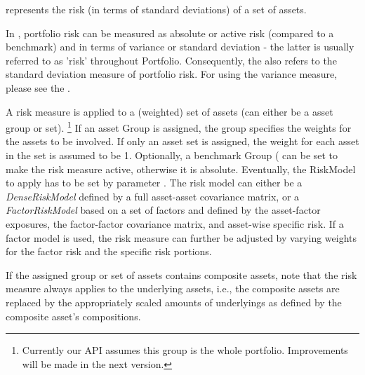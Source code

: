       represents the risk (in terms of standard deviations) of a set of assets. 

      In \axioma, portfolio risk can be measured as absolute or active risk (compared to a benchmark) 
      and in terms of variance or standard deviation - the latter is usually referred to as 'risk' throughout \axioma Portfolio. 
      Consequently, the  also refers to the standard deviation measure of portfolio risk. 
      For using the variance measure, please see the . 

      A risk measure is applied to a (weighted) set of assets (can either be a asset group or set). 
      \footnote{Currently our \matlab{} API assumes this group is the whole portfolio. Improvements will be made in the next version.}
      If an asset Group is assigned, the group specifies the weights for the assets to be involved. 
      If only an asset set is assigned, the weight for each asset in the set is assumed to be 1.
      Optionally, a benchmark Group ( can be set to make the risk measure active, otherwise it is absolute. 
      Eventually, the RiskModel to apply has to be set by parameter . 
      The risk model can either be a \emph{DenseRiskModel} defined by a full asset-asset covariance matrix, 
      or a \emph{FactorRiskModel} based on a set of factors and defined by the asset-factor exposures, 
      the factor-factor covariance matrix, and asset-wise specific risk. 
      If a factor model is used, the risk measure can further be adjusted by varying weights for the factor risk and the specific risk portions. 

      If the assigned group or set of assets contains composite assets, note that the risk measure always applies to the underlying assets, 
      i.e., the composite assets are replaced by the appropriately scaled amounts of underlyings as defined by the composite asset's compositions. 


